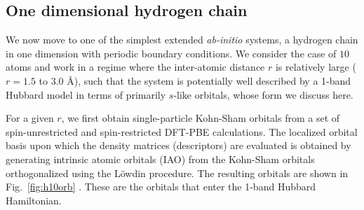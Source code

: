 \subsection{One dimensional hydrogen chain}
We now move to one of the simplest extended \emph{ab-initio} systems, a hydrogen chain in one dimension with periodic boundary conditions. 
We consider the case of $10$ atoms and work in a regime where the inter-atomic distance $r$ is 
relatively large ($r=1.5$ to $3.0$ \AA), such that the system is potentially well described by a 1-band Hubbard model 
in terms of primarily $s$-like orbitals, whose form we discuss here. 


For a given $r$, we first obtain single-particle Kohn-Sham orbitals from a set of spin-unrestricted and 
spin-restricted DFT-PBE calculations. The localized orbital basis upon which the density matrices (descriptors) 
are evaluated is obtained by generating intrinsic atomic orbitals (IAO) from the Kohn-Sham orbitals 
orthogonalized using the L\"owdin procedure. The resulting orbitals are shown in Fig.~\ref{fig:h10orb} . These are the orbitals that enter the 1-band Hubbard Hamiltonian. 


